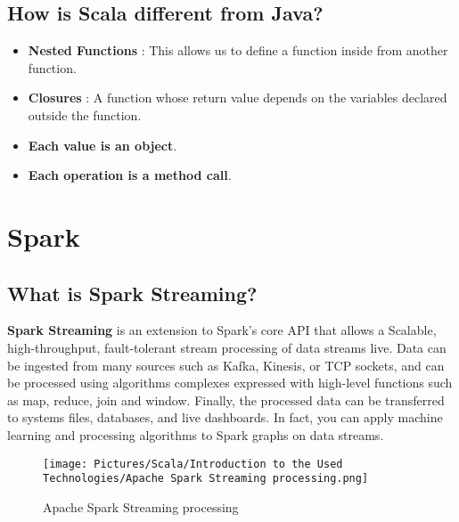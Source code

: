 \begin{spacing}{1.5}
\subsection{How is Scala different from Java?}
\begin{itemize}
   \item \textbf{Nested Functions} : This allows us to define a function inside
from another function.
   \item \textbf{Closures} : A function whose return value depends on the variables
declared outside the function.
   \item \textbf{Each value is an object}.
   \item \textbf{Each operation is a method call}.
\end{itemize}   

\newpage 
 \section{Spark}  
 \subsection{What is Spark Streaming?}
 \par  \textbf{Spark Streaming} is an extension to Spark's core API that allows a Scalable, high-throughput, fault-tolerant stream processing of data streams live. Data can be ingested from many sources such as Kafka, Kinesis, or TCP sockets, and can be processed using algorithms complexes expressed with high-level functions such as map, reduce, join and window. Finally, the processed data can be transferred to systems files, databases, and live dashboards. In fact, you can apply machine learning and processing algorithms to Spark graphs on data streams.
\\ 
 
\begin{figure}[!htb] 
\begin{center} 
\texttt{[image: Pictures/Scala/Introduction to the Used Technologies/Apache Spark Streaming processing.png]}
\end{center} 
\caption{Apache Spark Streaming processing} 
\end{figure}  \FloatBarrier
\\


\end{spacing}
